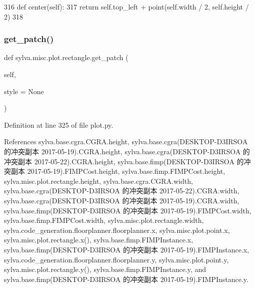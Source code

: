 \begin{DoxyCode}
316         \textcolor{keyword}{def }center(self):
317             \textcolor{keywordflow}{return} self.top\_left + point(self.width / 2, self.height / 2)
318 
\end{DoxyCode}
\mbox{\label{classsylva_1_1misc_1_1plot_1_1rectangle_af3defb54fedda1e1f8d886e5f840bb72}} 
\subsubsection{\texorpdfstring{get\+\_\+patch()}{get\_patch()}}
{\footnotesize\ttfamily def sylva.\+misc.\+plot.\+rectangle.\+get\+\_\+patch (\begin{DoxyParamCaption}\item[{}]{self,  }\item[{}]{style = {\ttfamily None} }\end{DoxyParamCaption})}



Definition at line 325 of file plot.\+py.



References sylva.\+base.\+cgra.\+C\+G\+R\+A.\+height, sylva.\+base.\+cgra(\+D\+E\+S\+K\+T\+O\+P-\/\+D3\+I\+R\+S\+O\+A 的冲突副本 2017-\/05-\/19).\+C\+G\+R\+A.\+height, sylva.\+base.\+cgra(\+D\+E\+S\+K\+T\+O\+P-\/\+D3\+I\+R\+S\+O\+A 的冲突副本 2017-\/05-\/22).\+C\+G\+R\+A.\+height, sylva.\+base.\+fimp(\+D\+E\+S\+K\+T\+O\+P-\/\+D3\+I\+R\+S\+O\+A 的冲突副本 2017-\/05-\/19).\+F\+I\+M\+P\+Cost.\+height, sylva.\+base.\+fimp.\+F\+I\+M\+P\+Cost.\+height, sylva.\+misc.\+plot.\+rectangle.\+height, sylva.\+base.\+cgra.\+C\+G\+R\+A.\+width, sylva.\+base.\+cgra(\+D\+E\+S\+K\+T\+O\+P-\/\+D3\+I\+R\+S\+O\+A 的冲突副本 2017-\/05-\/22).\+C\+G\+R\+A.\+width, sylva.\+base.\+cgra(\+D\+E\+S\+K\+T\+O\+P-\/\+D3\+I\+R\+S\+O\+A 的冲突副本 2017-\/05-\/19).\+C\+G\+R\+A.\+width, sylva.\+base.\+fimp(\+D\+E\+S\+K\+T\+O\+P-\/\+D3\+I\+R\+S\+O\+A 的冲突副本 2017-\/05-\/19).\+F\+I\+M\+P\+Cost.\+width, sylva.\+base.\+fimp.\+F\+I\+M\+P\+Cost.\+width, sylva.\+misc.\+plot.\+rectangle.\+width, sylva.\+code\+\_\+generation.\+floorplanner.\+floorplanner.\+x, sylva.\+misc.\+plot.\+point.\+x, sylva.\+misc.\+plot.\+rectangle.\+x(), sylva.\+base.\+fimp.\+F\+I\+M\+P\+Instance.\+x, sylva.\+base.\+fimp(\+D\+E\+S\+K\+T\+O\+P-\/\+D3\+I\+R\+S\+O\+A 的冲突副本 2017-\/05-\/19).\+F\+I\+M\+P\+Instance.\+x, sylva.\+code\+\_\+generation.\+floorplanner.\+floorplanner.\+y, sylva.\+misc.\+plot.\+point.\+y, sylva.\+misc.\+plot.\+rectangle.\+y(), sylva.\+base.\+fimp.\+F\+I\+M\+P\+Instance.\+y, and sylva.\+base.\+fimp(\+D\+E\+S\+K\+T\+O\+P-\/\+D3\+I\+R\+S\+O\+A 的冲突副本 2017-\/05-\/19).\+F\+I\+M\+P\+Instance.\+y.


